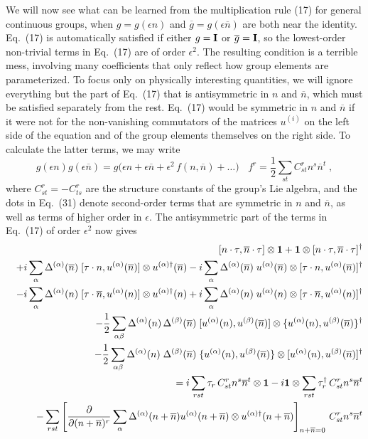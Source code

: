 \documentclass[12pt]{article}
\def\BM#1{\mbox{\boldmath{$#1$}}}
\begin{document}
We will now see what can be learned from the  multiplication rule (17) for general continuous groups, when $g=g(\epsilon n)$ and $\overline{g}=g(\epsilon\overline{n})$ are both near the identity.  Eq.~(17) is automatically satisfied if either $g={\bf I}$ or $\overline{g}={\bf I}$, so the lowest-order non-trivial terms in Eq.~(17) are of order $\epsilon^2$.  The resulting condition is a terrible mess, involving many coefficients that only reflect how group elements are parameterized.   To focus only on physically interesting quantities, we will ignore everything but the part of Eq.~(17) that is antisymmetric in $n$ and $\overline{n}$, which must be satisfied separately from the rest.   Eq.~(17) would be symmetric in $n$ and $\overline{n}$ if it were not for the non-vanishing commutators of the matrices $u^{(i)}$ on the left side of the equation and of the group elements themselves on the right side.  To calculate the latter terms, we may write                  
\begin{equation}
g(\epsilon n)g(\epsilon \overline{n})=g\Big(\epsilon n+\epsilon\overline{n}+\epsilon^2\,f(n,\overline{n})+\dots\Big)~~~~f^r=\frac{1}{2}\sum_{st}C^r_{st}n^s\overline{n}^t\;,
\end{equation}
where $C^r_{st}=-C^r_{ts}$ are the structure constants of the group's Lie algebra, and the dots in Eq.~(31) denote second-order terms that are symmetric in $n$ and $\overline{n}$, as well as terms of higher order in $\epsilon$.  The antisymmetric part of the terms in Eq.~(17) of order $\epsilon^2$ now gives
\begin{eqnarray}
&& [n\cdot\tau,\overline{n}\cdot\tau]\otimes {\BM 1}+{\BM 1}\otimes[n\cdot\tau,\overline{n}\cdot\tau]^\dagger\nonumber\\&&+i\sum_\alpha \Delta^{(\alpha)}(\overline{n})\;[\tau\cdot n,u^{(\alpha)}(\overline{n})]\otimes u^{(\alpha)\dagger}(\overline{n})-i\sum_\alpha \Delta^{(\alpha)}(\overline{n})\;
u^{(\alpha)}(\overline{n})\otimes [\tau\cdot n,u^{(\alpha)}(\overline{n})]^\dagger\nonumber\\&&
-i\sum_\alpha \Delta^{(\alpha)}(n)\;[\tau\cdot \overline{n},u^{(\alpha)}(n)]\otimes u^{(\alpha)\dagger}(n)+i\sum_\alpha \Delta^{(\alpha)}(n)\;
u^{(\alpha)}(n)\otimes [\tau\cdot \overline{n},u^{(\alpha)}(n)]^\dagger\nonumber\\&&
-\frac{1}{2}\sum_{\alpha\beta}\Delta^{(\alpha)}(n)\,\Delta^{(\beta)}(\overline{n})\;[u^{(\alpha)}(n),u^{(\beta)}(\overline{n})]\otimes \{u^{(\alpha)}(n),u^{(\beta)}(\overline{n})\}^\dagger\nonumber\\&&~~~
-\frac{1}{2}\sum_{\alpha\beta}\Delta^{(\alpha)}(n)\;\Delta^{(\beta)}(\overline{n})\;\{u^{(\alpha)}(n),u^{(\beta)}(\overline{n})\}\otimes [u^{(\alpha)}(n),u^{(\beta)}(\overline{n})]^\dagger\nonumber\\&&
=i\sum_{rst}\tau_r\,C^r_{st}n^s\overline{n}^t\otimes {\BM 1}-i{\BM 1}\otimes\sum_{rst}\tau^\dagger_r\,C^r_{st}n^s\overline{n}^t\nonumber\\&& -\sum_{rst} \left[\frac{\partial}{\partial (n+\overline{n})^r}\sum_\alpha\Delta^{(\alpha)}(n+\overline{n})u^{(\alpha)}(n+\overline{n})\otimes u^{(\alpha)\dagger}(n+\overline{n})\right]_{n+\overline{n}=0}\,C^r_{st}n^s\overline{n}^t
\end{eqnarray}
\end{document}
